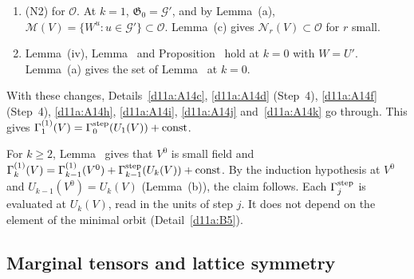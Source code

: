 \begin{detail}
\begin{step}[$k=1$: the list of changes]
\begin{enumerate}[label=(\roman*)]
\item (N2) for $\mathscr O$. At $k=1$, $\mathfrak G_0=\mathcal G'$, and by Lemma~(a), $\mathscr M(V)=\{W^u:u\in\mathcal G'\}\subset\mathscr O$. Lemma~(c) gives $\mathscr N_r(V)\subset\mathscr O$ for $r$ small.
\item Lemma~(iv), Lemma~ and Proposition~ hold at $k=0$ with $W=U'$. Lemma~(a) gives the set of Lemma~ at $k=0$.
\end{enumerate}
With these changes, Details~\ref{d11a:A14c}, \ref{d11a:A14d} (Step~4), \ref{d11a:A14f} (Step~4), \ref{d11a:A14h}, \ref{d11a:A14i}, \ref{d11a:A14j} and~\ref{d11a:A14k} go through. This gives $\Gamma^{(1)}_1(V)=\Gamma^{\rm step}_0(U_1(V))+\mathrm{const}$.
\end{step}
\begin{step}[Induction]
For $k\ge2$, Lemma~ gives that $V^0$ is small field and $\Gamma^{(1)}_k(V)=\Gamma^{(1)}_{k-1}(V^0)+\Gamma^{\rm step}_{k-1}(U_k(V))+\mathrm{const}$. By the induction hypothesis at $V^0$ and $U_{k-1}(V^0)=U_k(V)$ (Lemma~(b)), the claim follows. Each $\Gamma^{\rm step}_j$ is evaluated at $U_k(V)$, read in the units of step $j$. It does not depend on the element of the minimal orbit (Detail~\ref{d11a:B5}).
\end{step}
\end{detail}

\subsection{Marginal tensors and lattice symmetry}\label{d11a:marginal}

